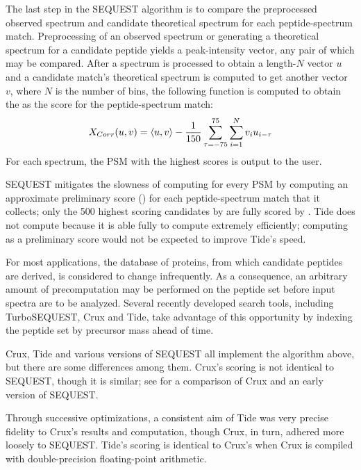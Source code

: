 The last step in the SEQUEST algorithm is to compare the preprocessed
observed spectrum and candidate theoretical spectrum for each
peptide-spectrum match. Preprocessing of an observed spectrum or
generating a theoretical spectrum for a candidate peptide yields
a peak-intensity vector, any pair of which may be compared. After a
spectrum is processed to obtain a length-$N$ vector $u$ and a candidate
match's theoretical spectrum is computed to get another vector $v$,
where $N$ is the number of bins, the following function is computed to
obtain the \XCorr as the score for the peptide-spectrum match:
\[X_{Corr}(u,v)=\langle u,v\rangle-\frac{1}{150}\sum_{\tau=-75}^{75}{\sum_{i=1}^{N}{v_iu_{i-\tau}}}\]
For each spectrum, the PSM with the highest \XCorr scores is output
to the user.

SEQUEST mitigates the slowness of computing \XCorr for every PSM by
computing an approximate preliminary score (\Sp) for each
peptide-spectrum match that it collects; only the 500 highest scoring
candidates by \Sp are fully scored by \XCorr. Tide does not compute
\Sp because it is able fully to compute \XCorr extremely
efficiently; computing \Sp as a preliminary score would not be
expected to improve Tide's speed.

For most applications, the database of proteins, from which candidate
peptides are derived, is considered to change infrequently. As a
consequence, an arbitrary amount of precomputation may be performed on
the peptide set before input spectra are to be analyzed.  Several
recently developed search tools, including TurboSEQUEST, Crux and
Tide, take advantage of this opportunity by indexing the peptide set
by precursor mass ahead of time.

Crux, Tide and various versions of SEQUEST all implement the
algorithm above, but there are some differences among them. Crux's
scoring is not identical to SEQUEST, though it is similar; see
\cite{park:rapid} for a comparison of Crux and an early version of
SEQUEST.
\DIFaddbegin 

\DIFaddend Through successive optimizations, a consistent aim of Tide was very
precise fidelity to Crux's results and \XCorr computation, though
Crux, in turn, adhered more loosely to SEQUEST. Tide's scoring is
identical to Crux's when Crux is compiled with double-precision
floating-point arithmetic. \DIFaddbegin {}\XCorr {}\DIFaddend 

